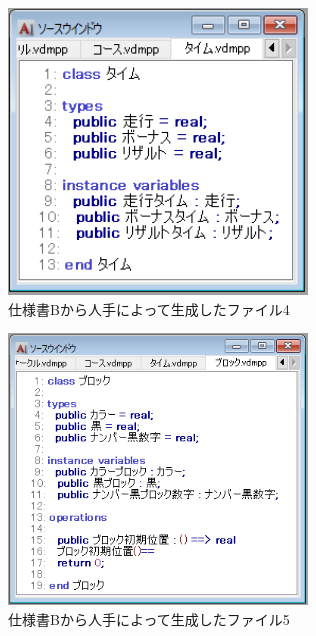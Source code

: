 \begin{figure}[tp]
    \begin{center}
    \includegraphics[width=300]{image/speB_vdm4.PNG}
    \caption{仕様書Bから人手によって生成したファイル4}
    \label{fig:speB_vdm4}
    \end{center}
\end{figure}

\begin{figure}[tp]
    \begin{center}
    \includegraphics[width=300]{image/speB_vdm5.PNG}
    \caption{仕様書Bから人手によって生成したファイル5}
    \label{fig:speB_vdm5}
    \end{center}
\end{figure}

